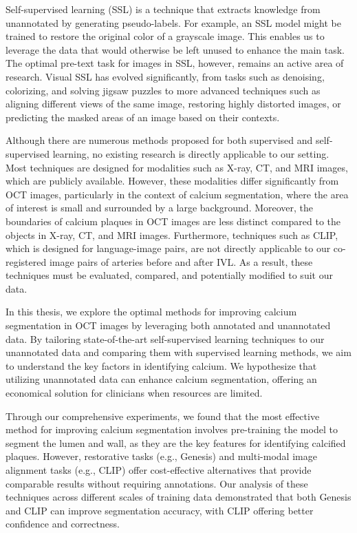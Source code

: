 \documentclass[a4paper,11pt,oneside]{report}
\begin{document}
Self-supervised learning (SSL) is a technique that extracts knowledge from unannotated by generating pseudo-labels. For example, an SSL model might be trained to restore the original color of a grayscale image. This enables us to leverage the data that would otherwise be left unused to enhance the main task. The optimal pre-text task for images in SSL, however, remains an active area of research. Visual SSL has evolved significantly, from tasks such as denoising, colorizing, and solving jigsaw puzzles to more advanced techniques such as aligning different views of the same image, restoring highly distorted images, or predicting the masked areas of an image based on their contexts. 

Although there are numerous methods proposed for both supervised and self-supervised learning, no existing research is directly applicable to our setting. Most techniques are designed for modalities such as X-ray, CT, and MRI images, which are publicly available. However, these modalities differ significantly from OCT images, particularly in the context of calcium segmentation, where the area of interest is small and surrounded by a large background. Moreover, the boundaries of calcium plaques in OCT images are less distinct compared to the objects in X-ray, CT, and MRI images. Furthermore, techniques such as CLIP, which is designed for language-image pairs, are not directly applicable to our co-registered image pairs of arteries before and after IVL. As a result, these techniques must be evaluated, compared, and potentially modified to suit our data. 

In this thesis, we explore the optimal methods for improving calcium segmentation in OCT images by leveraging both annotated and unannotated data. By tailoring state-of-the-art self-supervised learning techniques to our unannotated data and comparing them with supervised learning methods, we aim to understand the key factors in identifying calcium. 
We hypothesize that utilizing unannotated data can enhance calcium segmentation, offering an economical solution for clinicians when resources are limited.

Through our comprehensive experiments, we found that the most effective method for improving calcium segmentation involves pre-training the model to segment the lumen and wall, as they are the key features for identifying calcified plaques. However, restorative tasks (e.g., Genesis) and multi-modal image alignment tasks (e.g., CLIP) offer cost-effective alternatives that provide comparable results without requiring annotations. Our analysis of these techniques across different scales of training data demonstrated that both Genesis and CLIP can improve segmentation accuracy, with CLIP offering better confidence and correctness.
\end{document}
